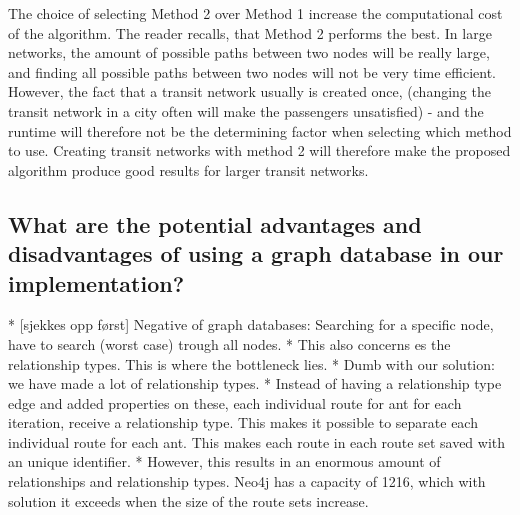     The choice of selecting Method 2 over Method 1 increase the computational cost of the algorithm. The reader recalls, that Method 2 performs the best. In large networks, the amount of possible paths between two nodes will be really large, and finding all possible paths between two nodes will not be very time efficient. However, the fact that a transit network usually is created once, (changing the transit network in a city often will make the passengers unsatisfied) - and the runtime will therefore not be the determining factor when selecting which method to use. Creating transit networks with method 2 will therefore make the proposed algorithm produce good results for larger transit networks. 



    

\subsection{What are the potential advantages and disadvantages of using a graph database in our implementation?}

    * [sjekkes opp først] Negative of graph databases: Searching for a specific node, have to search (worst case) trough all nodes. 
    * This also concerns es the relationship types. This is where the bottleneck lies. 
    * Dumb with our solution: we have made a lot of relationship types. 
    * Instead of having a relationship type edge and added properties on these, each individual route for ant for each iteration, receive a relationship type. This makes it possible to separate each individual route for each ant. This makes each route in each route set saved with an unique identifier. 
    * However, this results in an enormous amount of relationships and relationship types. Neo4j has a capacity of 1216, which with solution it exceeds when the size of the route sets increase. 


